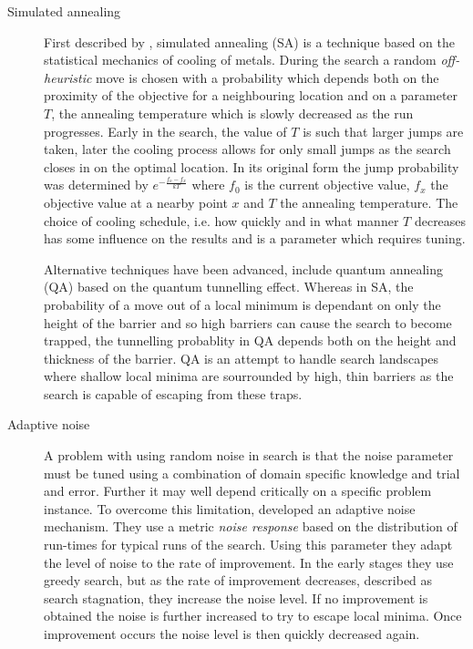 \begin{description}
\item[Simulated annealing]
First described by \citet{kirkpatrick83optimization}, simulated annealing (SA) is a technique based on the statistical mechanics of cooling of metals. During the search a random \emph{off-heuristic} move is chosen with a probability which depends both on the proximity of the objective for a neighbouring location and on a parameter $T$, the annealing temperature which is slowly decreased as the run progresses. Early in the search, the value of $T$ is such that larger jumps are taken, later the cooling process allows for only small jumps as the search closes in on the optimal location. In its original form the jump probability was determined by $e^{-\frac{f_o-f_x}{kT}}$ where $f_0$ is the current objective value, $f_x$ the objective value at a nearby point $x$ and $T$ the annealing temperature. The choice of cooling schedule, i.e. how quickly and in what manner $T$ decreases has some influence on the results and is a parameter which requires tuning.

 Alternative techniques have been advanced, include quantum annealing (QA) \citep{apolloni89quantum} based on the quantum tunnelling effect. Whereas in SA, the probability of a move out of a local minimum is dependant on only the height of the barrier and so high barriers can cause the search to become trapped, the tunnelling probablity in QA depends both on the height and thickness of the barrier. QA is an attempt to handle search landscapes where shallow local minima are sourrounded by high, thin barriers as the search is capable of escaping from these traps.


\item[Adaptive noise]
A problem with using random noise in search is that the noise parameter must be tuned using a combination of domain specific knowledge and trial and error. Further it may well depend critically on a specific problem instance. To overcome this limitation, \citet{hoos02adaptive} developed an adaptive noise mechanism. They use a metric \emph{noise response} based on the distribution of run-times for typical runs of the search. Using this parameter they adapt the level of noise to the rate of improvement. In the early stages they use greedy search, but as the rate of improvement decreases, described as search stagnation, they increase the noise level. If no improvement is obtained the noise is further increased to try to escape local minima. Once improvement occurs the noise level is then quickly decreased again.


\end{description}
